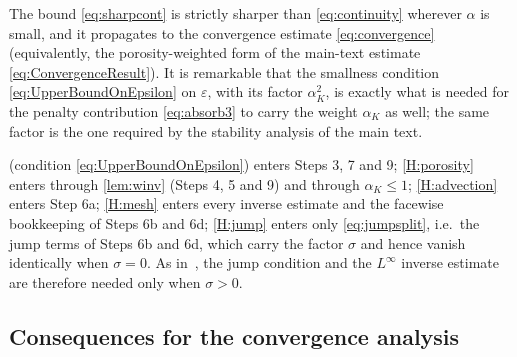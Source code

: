 \begin{remark}\label{rem:sharper}
The bound \eqref{eq:sharpcont} is strictly sharper than \eqref{eq:continuity} wherever
$\alpha$ is small, and it propagates to the convergence estimate
\eqref{eq:convergence} (equivalently, the porosity{\hyp}weighted form of the main-text
estimate \eqref{eq:ConvergenceResult}). It is remarkable that the smallness condition
\eqref{eq:UpperBoundOnEpsilon} on $\varepsilon$, with its factor $\alpha_K^2$, is exactly what is
needed for the penalty contribution \eqref{eq:absorb3} to carry the weight $\alpha_K$ as
well; the same factor is the one required by the stability analysis of the main text.
\end{remark}

\begin{remark}\label{rem:hypotheses}
 (condition \eqref{eq:UpperBoundOnEpsilon}) enters Steps 3, 7 and 9;
\cref{H:porosity} enters through \cref{lem:winv} (Steps 4, 5 and 9) and through
$\alpha_K\le1$; \cref{H:advection} enters Step 6a; \cref{H:mesh} enters every inverse
estimate and the facewise bookkeeping of Steps 6b and 6d; \cref{H:jump} enters only
\eqref{eq:jumpsplit}, i.e.\ the jump terms of Steps 6b and 6d, which carry the factor
$\sigma$ and hence vanish identically when $\sigma=0$. As in~\cite{codina2001stabilized}, the jump
condition and the $L^\infty$ inverse estimate are therefore needed only when $\sigma>0$.
\end{remark}

\subsection{Consequences for the convergence analysis}\label{sec:convergence}

